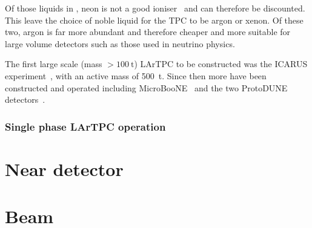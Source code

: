 Of those liquids in , neon is not a good ioniser~\cite{schumann2012dark} and can therefore be discounted.
This leave the choice of noble liquid for the TPC to be argon or xenon.
Of these two, argon is far more abundant and therefore cheaper and more suitable for large volume detectors such as those used in neutrino physics.

The first large scale (mass $>\SI{100}{\tonne}$) LArTPC to be constructed was the ICARUS experiment~\cite{icarus}, with an active mass of \SI{500}{\tonne}.
Since then more have been constructed and operated including MicroBooNE~\cite{uBooneConstruct} and the two ProtoDUNE detectors~\cite{protoduneSP_tdr, cuesta2019status}.

\subsubsection{Single phase LArTPC operation}


\section{Near detector}
\label{sec:dune:nd}

\blindtext

\section{Beam}
\label{sec:dune:beam}

\blindtext
